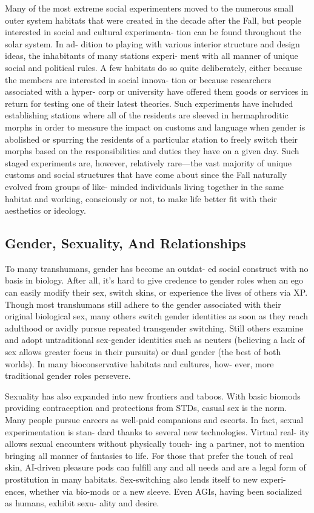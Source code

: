Many of the most extreme social experimenters 
moved to the numerous small outer system habitats 
that were created in the decade after the Fall, but 
people interested in social and cultural experimenta-
tion can be found throughout the solar system. In ad-
dition to playing with various interior structure and 
design ideas, the inhabitants of many stations experi-
ment with all manner of unique social and political 
rules. A few habitats do so quite deliberately, either 
because the members are interested in social innova-
tion or because researchers associated with a hyper-
corp or university have offered them goods or services 
in return for testing one of their latest theories. Such 
experiments have included establishing stations where 
all of the residents are sleeved in hermaphroditic 
morphs in order to measure the impact on customs 
and language when gender is abolished or spurring 
the residents of a particular station to freely switch 
their morphs based on the responsibilities and duties 
they have on a given day. Such staged experiments are, 
however, relatively rare—the vast majority of unique 
customs and social structures that have come about 
since the Fall naturally evolved from groups of like-
minded individuals living together in the same habitat 
and working, consciously or not, to make life better 
fit with their aesthetics or ideology.

\subsection{Gender, Sexuality, And Relationships}

To many transhumans, gender has become an outdat-
ed social construct with no basis in biology. After all, 
it's hard to give credence to gender roles when an ego 
can easily modify their sex, switch skins, or experience 
the lives of others via XP. Though most transhumans 
still adhere to the gender associated with their original 
biological sex, many others switch gender identities 
as soon as they reach adulthood or avidly pursue 
repeated transgender switching. Still others examine 
and adopt untraditional sex-gender identities such as 
neuters (believing a lack of sex allows greater focus in 
their pursuits) or dual gender (the best of both worlds). 
In many bioconservative habitats and cultures, how-
ever, more traditional gender roles persevere.

Sexuality has also expanded into new frontiers and 
taboos. With basic biomods providing contraception 
and protections from STDs, casual sex is the norm. 
Many people pursue careers as well-paid companions 
and escorts. In fact, sexual experimentation is stan-
dard thanks to several new technologies. Virtual real-
ity allows sexual encounters without physically touch-
ing a partner, not to mention bringing all manner of 
fantasies to life. For those that prefer the touch of real 
skin, AI-driven pleasure pods can fulfill any and all 
needs and are a legal form of prostitution in many 
habitats. Sex-switching also lends itself to new experi-
ences, whether via bio-mods or a new sleeve. Even 
AGIs, having been socialized as humans, exhibit sexu-
ality and desire.

